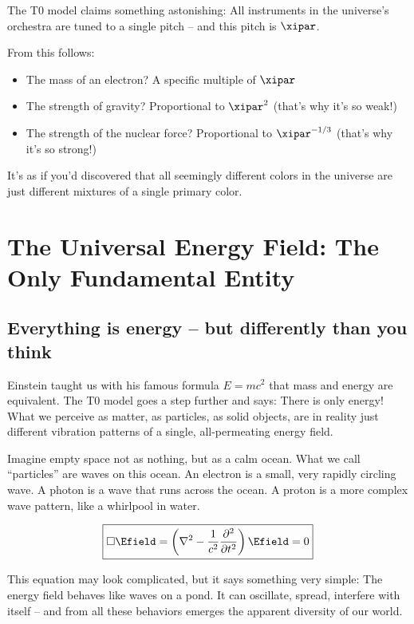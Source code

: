 	\begin{important}
		The T0 model claims something astonishing: All instruments in the universe's orchestra are tuned to a single pitch -- and this pitch is $\xipar$. 
		
		From this follows:
		\begin{itemize}
			\item The mass of an electron? A specific multiple of $\xipar$
			\item The strength of gravity? Proportional to $\xipar^2$ (that's why it's so weak!)
			\item The strength of the nuclear force? Proportional to $\xipar^{-1/3}$ (that's why it's so strong!)
		\end{itemize}
	\end{important}
	
	It's as if you'd discovered that all seemingly different colors in the universe are just different mixtures of a single primary color.
	
	\section{The Universal Energy Field: The Only Fundamental Entity}
	
	\subsection{Everything is energy -- but differently than you think}
	
	Einstein taught us with his famous formula $E = mc^2$ that mass and energy are equivalent. The T0 model goes a step further and says: There is only energy! What we perceive as matter, as particles, as solid objects, are in reality just different vibration patterns of a single, all-permeating energy field.
	
	Imagine empty space not as nothing, but as a calm ocean. What we call ``particles'' are waves on this ocean. An electron is a small, very rapidly circling wave. A photon is a wave that runs across the ocean. A proton is a more complex wave pattern, like a whirlpool in water.
	
	\begin{equation}
		\boxed{\square \Efield = \left(\nabla^2 - \frac{1}{c^2}\frac{\partial^2}{\partial t^2}\right) \Efield = 0}
	\end{equation}
	
	This equation may look complicated, but it says something very simple: The energy field behaves like waves on a pond. It can oscillate, spread, interfere with itself -- and from all these behaviors emerges the apparent diversity of our world.
	

